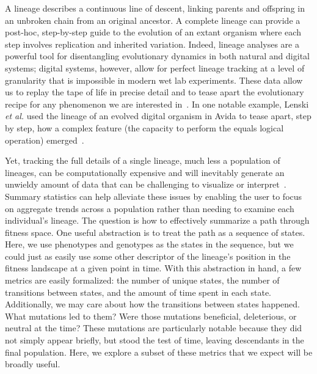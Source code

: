 \documentclass[letterpaper]{article}
\begin{document}
A lineage describes a continuous line of descent, linking parents and offspring in an unbroken chain from an original ancestor.
A complete lineage can provide a post-hoc, step-by-step guide to the evolution of an extant organism where each step involves replication and inherited variation. Indeed, lineage analyses are a powerful tool for disentangling evolutionary dynamics in both natural and digital systems; digital systems, however, allow for perfect lineage tracking at a level of granularity that is impossible in modern wet lab experiments.  These data allow us to replay the tape of life in precise detail and to tease apart the evolutionary recipe for any phenomenon we are interested in~\citep{mcphee_using_2016}. 
In one notable example, Lenski \textit{et al.} used the lineage of an evolved digital organism in Avida to tease apart, step by step, how a complex feature (the capacity to perform the equals logical operation) emerged~\citep{lenski_evolutionary_2003}. 

Yet, tracking the full details of a single lineage, much less a population of lineages, can be computationally expensive and will inevitably generate an unwieldy amount of data that can be challenging to visualize or interpret~\citep{mcphee_visualizing_2016}.
Summary statistics can help alleviate these issues by enabling the user to focus on aggregate trends across a population rather than needing to examine each individual's lineage.
The question is how to effectively summarize a path through fitness space. One useful abstraction is to treat the path as a sequence of states. Here, we use phenotypes and genotypes as the states in the sequence, but we could just as easily use some other descriptor of the lineage's position in the fitness landscape at a given point in time.
With this abstraction in hand, a few metrics are easily formalized: the number of unique states, the number of transitions between states, and the amount of time spent in each state.
Additionally, we may care about how the transitions between states happened. What mutations led to them? Were those mutations beneficial, deleterious, or neutral at the time? These mutations are particularly notable because they did not simply appear briefly, but stood the test of time, leaving descendants in the final population.
Here, we explore a subset of these metrics that we expect will be broadly useful.
\end{document}
